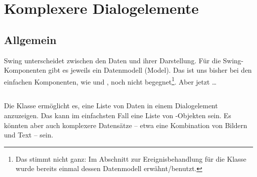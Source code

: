 \clearpage

\rehead[]{\textcolor{lightblue}{AvHG, Inf, My}}
\lohead[]{\textcolor{lightblue}{AvHG, Inf, My}}

\lstset{style=myJava}

\section{Komplexere Dialogelemente}

\subsection{Allgemein}

Swing unterscheidet zwischen den Daten und ihrer Darstellung. Für die
Swing-Komponenten gibt es jeweils ein Datenmodell (Model). Das ist uns bisher
bei den einfachen Komponenten, wie  und ,
noch nicht begegnet\footnote{Das stimmt nicht ganz: Im Abschnitt zur
Ereignisbehandlung für die Klasse  wurde bereits einmal
dessen Datenmodell erwähnt/benutzt.}.
Aber jetzt \ldots


\subsection{}

Die Klasse  ermöglicht es, eine Liste von Daten in einem
Dialogelement anzuzeigen. Das kann im einfachsten Fall eine Liste von
-Objekten sein. Es könnten aber auch komplexere Datensätze --
etwa eine Kombination von Bildern und Text -- sein.

